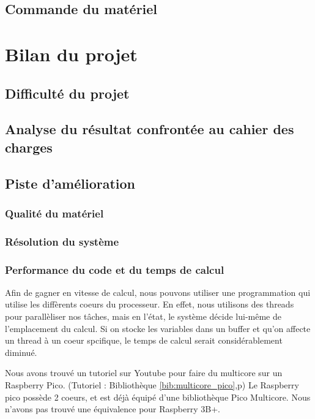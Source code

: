 \documentclass[a4paper]{report}
\begin{document}
        \section{Commande du matériel}

    \chapter{Bilan du projet}

        \section{Difficulté du projet}
        \section{Analyse du résultat confrontée au cahier des charges}
        \section{Piste d'amélioration}
            \subsection{Qualité du matériel}
            \subsection{Résolution du système}
            
            \subsection{Performance du code et du temps de calcul}
            
            Afin de gagner en vitesse de calcul, nous pouvons utiliser une programmation qui utilise
    les diffèrents coeurs du processeur. En effet, nous utilisons des threads pour parallèliser
    nos t\^{a}ches, mais en l'état, le système décide lui-m\^{e}me de l'emplacement du calcul.
    Si on stocke les variables dans un buffer et qu'on affecte un thread à un coeur spcifique, 
    le temps de calcul serait considérablement diminué. 
    
    Nous avons trouvé un tutoriel sur Youtube pour faire du multicore sur un Raspberry Pico.
    (Tutoriel : Bibliothèque \ref{bib:multicore_pico},p\pageref{bib:multicore_pico})
    Le Raspberry pico possède 2 coeurs, et est déjà équipé d'une bibliothèque Pico Multicore.
    Nous n'avons pas trouvé une équivalence pour Raspberry 3B+. 
\end{document}
